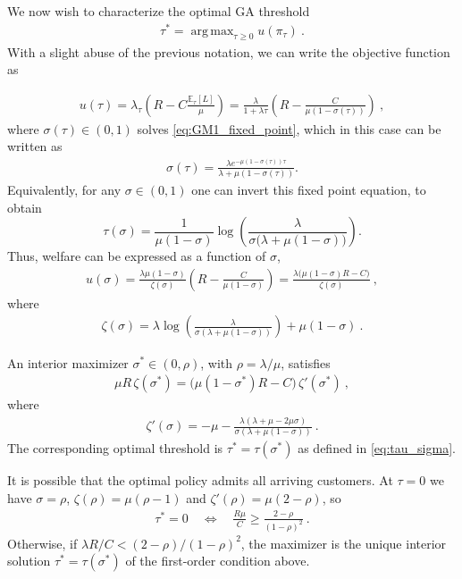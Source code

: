 \documentclass[11pt]{article}
\def\E{\mathbb{E}}
\DeclareMathOperator*{\argmax}{arg\,max}
\begin{document}
We now wish to characterize the optimal GA threshold
\begin{align*}
    \tau^*=\argmax_{\tau\geq 0} u(\pi_\tau)\ . 
\end{align*}
With a slight abuse of the previous notation, we can write the objective function as 

\begin{align*}
    u(\tau)=\lambda_\tau\left(R-C\frac{\E_\tau[L]}{\mu}\right)=\frac{\lambda }{1+\lambda\tau}\left(R- \frac{C}{\mu(1-\sigma(\tau))}\right)\ ,
\end{align*}
where $\sigma(\tau)\in(0,1)$ solves \eqref{eq:GM1_fixed_point}, which in this case can be written as
\begin{align*}
\sigma(\tau)=\frac{\lambda e^{-\mu(1-\sigma(\tau))\tau}}{\lambda+\mu(1-\sigma(\tau))}.
\end{align*}
Equivalently, for any $\sigma\in(0,1)$ one can invert this fixed point equation,
to obtain
\begin{equation}\label{eq:tau_sigma}
\tau(\sigma)=\frac{1}{\mu(1-\sigma)}
\log\left(\frac{\lambda}{\sigma\bigl(\lambda+\mu(1-\sigma)\bigr)}\right).
\end{equation}
Thus, welfare can be expressed as a function of $\sigma$,
\begin{align*}
u(\sigma)=\frac{\lambda\mu(1-\sigma)}{\zeta(\sigma)}\left(R-\frac{C}{\mu(1-\sigma)}\right)=\frac{\lambda\bigl(\mu(1-\sigma)R-C\bigr)}{\zeta(\sigma)}\ ,
\end{align*}
where
\begin{align*}
\zeta(\sigma)=\lambda\log\left(\frac{\lambda}{\sigma(\lambda+\mu(1-\sigma))}\right)+\mu(1-\sigma)\ .
\end{align*}

An interior maximizer $\sigma^*\in(0,\rho)$, with $\rho=\lambda/\mu$, satisfies
\begin{align*}
\mu R\,\zeta(\sigma^*)=\bigl(\mu(1-\sigma^*)R-C\bigr)\,\zeta'(\sigma^*)\ ,
\end{align*}
where
\begin{align*}
\zeta'(\sigma)=-\mu-\frac{\lambda(\lambda+\mu-2\mu\sigma)}{\sigma(\lambda+\mu(1-\sigma))}\ .
\end{align*}
The corresponding optimal threshold is $\tau^*=\tau(\sigma^*)$ as defined in \eqref{eq:tau_sigma}.

It is possible that the optimal policy admits all arriving customers. At $\tau=0$ we have $\sigma=\rho$, $\zeta(\rho)=\mu(\rho-1)$ and $\zeta'(\rho)=\mu(2-\rho)$, so
\begin{align*}
\tau^*=0 \quad\Longleftrightarrow\quad
\frac{ R\mu  }{C}\geq \frac{2-\rho}{(1-\rho)^2}\ .
\end{align*}
Otherwise, if $\lambda R/C<(2-\rho) /(1-\rho)^2$, the maximizer is the unique interior solution $\tau^*=\tau(\sigma^*)$ of the first-order condition above.
\end{document}
